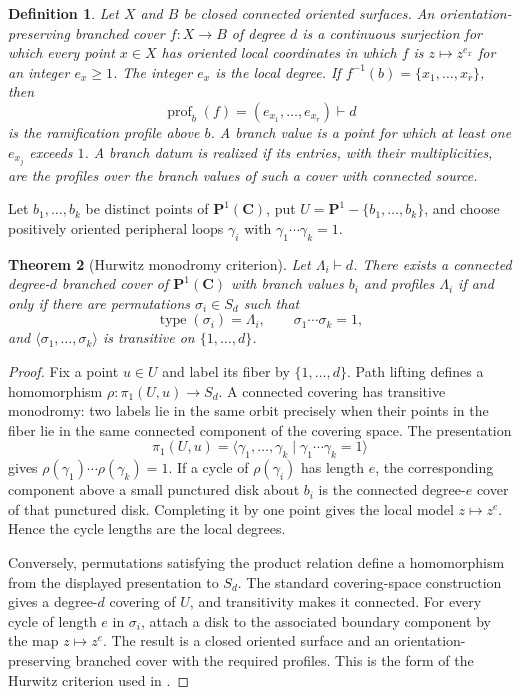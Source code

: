 \documentclass[10pt,a4paper]{amsart}
\newtheorem{theorem}{Theorem}[section]
\newtheorem{definition}[theorem]{Definition}
\numberwithin{equation}{section}
\begin{document}
\begin{definition}
Let $X$ and $B$ be closed connected oriented surfaces.  An
orientation-preserving branched cover $f:X\to B$ of degree $d$ is a
continuous surjection for which every point $x\in X$ has oriented local
coordinates in which $f$ is $z\mapsto z^{e_x}$ for an integer $e_x\geq1$.
The integer $e_x$ is the local degree.  If
$f^{-1}(b)=\{x_1,\ldots,x_r\}$, then
\[
 \operatorname{prof}_b(f)=(e_{x_1},\ldots,e_{x_r})\vdash d
\]
is the ramification profile above $b$.  A branch value is a point for which
at least one $e_{x_j}$ exceeds $1$.  A branch datum is realized if its
entries, with their multiplicities, are the profiles over the branch values
of such a cover with connected source.
\end{definition}

Let $b_1,\ldots,b_k$ be distinct points of $\mathbf P^1(\mathbf C)$, put
$U=\mathbf P^1-\{b_1,\ldots,b_k\}$, and choose positively oriented
peripheral loops $\gamma_i$ with $\gamma_1\cdots\gamma_k=1$.

\begin{theorem}[Hurwitz monodromy criterion]\label{thm:hurwitz-criterion}
Let $\Lambda_i\vdash d$.  There exists a connected degree-$d$ branched
cover of $\mathbf P^1(\mathbf C)$ with branch values $b_i$ and profiles
$\Lambda_i$ if and only if there are permutations
$\sigma_i\in S_d$ such that
\[
 \operatorname{type}(\sigma_i)=\Lambda_i,\qquad
 \sigma_1\cdots\sigma_k=1,
\]
and $\langle\sigma_1,\ldots,\sigma_k\rangle$ is transitive on
$\{1,\ldots,d\}$.
\end{theorem}

\begin{proof}
Fix a point $u\in U$ and label its fiber by $\{1,\ldots,d\}$.  Path lifting
defines a homomorphism $\rho:\pi_1(U,u)\to S_d$.  A connected covering has
transitive monodromy: two labels lie in the same orbit precisely when their
points in the fiber lie in the same connected component of the covering
space.  The presentation
\[
 \pi_1(U,u)=
 \langle\gamma_1,\ldots,\gamma_k\mid
   \gamma_1\cdots\gamma_k=1\rangle
\]
gives $\rho(\gamma_1)\cdots\rho(\gamma_k)=1$.  If a cycle of
$\rho(\gamma_i)$ has length $e$, the corresponding component above a small
punctured disk about $b_i$ is the connected degree-$e$ cover of that
punctured disk.  Completing it by one point gives the local model
$z\mapsto z^e$.  Hence the cycle lengths are the local degrees.

Conversely, permutations satisfying the product relation define a
homomorphism from the displayed presentation to $S_d$.  The standard
covering-space construction gives a degree-$d$ covering of $U$, and
transitivity makes it connected.  For every cycle of length $e$ in
$\sigma_i$, attach a disk to the associated boundary component by the map
$z\mapsto z^e$.  The result is a closed oriented surface and an
orientation-preserving branched cover with the required profiles.  This is
the form of the Hurwitz criterion used in \cite[Lemma~2.1]{EKS}.
\end{proof}
\end{document}
